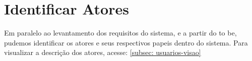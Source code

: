 \section{Identificar Atores}

Em paralelo ao levantamento dos requisitos do sistema, e a partir do to be, pudemos identificar os atores e seus respectivos papeis dentro do sistema. Para visualizar a descrição dos atores, acesse: \ref{subsec: usuarios-visao}
